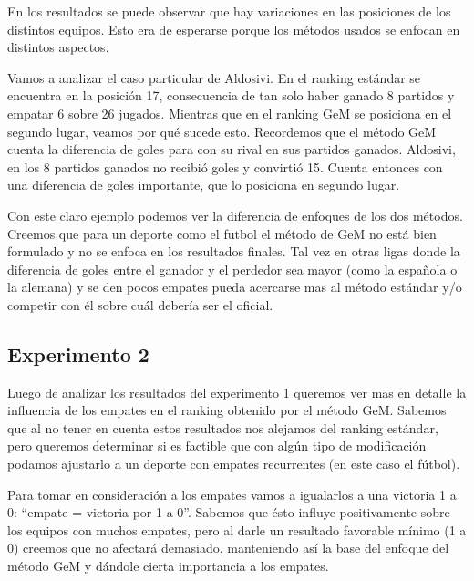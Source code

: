 \par En los resultados se puede observar que hay variaciones en las posiciones de los distintos equipos. Esto era de esperarse porque los m\'etodos usados se enfocan en distintos aspectos.
\bigskip

\par Vamos a analizar el caso particular de Aldosivi. En el ranking est\'andar se encuentra en la posici\'on 17, consecuencia de tan solo haber ganado 8 partidos y empatar 6 sobre 26 jugados. Mientras que en el ranking GeM se posiciona en el segundo lugar, veamos por qu\'e sucede esto. Recordemos que el m\'etodo GeM cuenta la diferencia de goles para con su rival en sus partidos ganados. Aldosivi, en los 8 partidos ganados no recibi\'o goles y convirti\'o 15. Cuenta entonces con una diferencia de goles importante, que lo posiciona en segundo lugar.

\par Con este claro ejemplo podemos ver la diferencia de enfoques de los dos m\'etodos. Creemos que para un deporte como el futbol el m\'etodo de GeM no est\'a bien formulado y no se enfoca en los resultados finales. Tal vez en otras ligas donde la diferencia de goles entre el ganador y el perdedor sea mayor (como la española o la alemana) y se den pocos empates pueda acercarse mas al m\'etodo est\'andar y/o competir con \'el sobre cu\'al deber\'ia ser el oficial.

\newpage

\subsection{Experimento 2}

\par Luego de analizar los resultados del experimento 1 queremos ver mas en detalle la influencia de los empates en el ranking obtenido por el m\'etodo GeM. Sabemos que al no tener en cuenta estos resultados nos alejamos del ranking est\'andar, pero queremos determinar si es factible que con alg\'un tipo de modificaci\'on podamos ajustarlo a un deporte con empates recurrentes (en este caso el f\'utbol).
\par Para tomar en consideraci\'on a los empates vamos a igualarlos a una victoria 1 a 0: ``empate = victoria por 1 a 0''. Sabemos que \'esto influye positivamente sobre los equipos con muchos empates, pero al darle un resultado favorable m\'inimo (1 a 0) creemos que no afectar\'a demasiado, manteniendo as\'i la base del enfoque del m\'etodo GeM y d\'andole cierta importancia a los empates.

